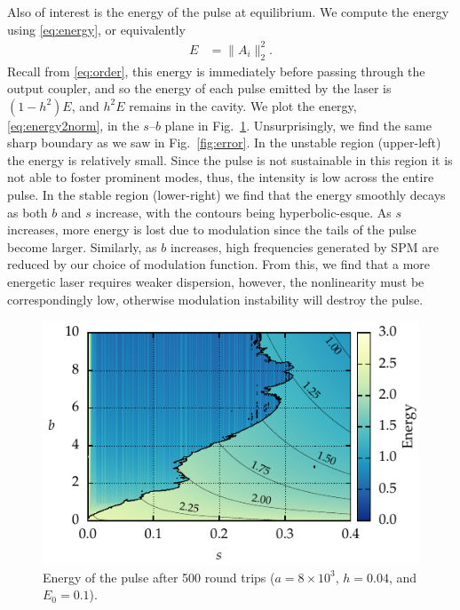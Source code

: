\documentclass[9pt,twocolumn,twoside]{osajnl}
\begin{document}
Also of interest is the energy of the pulse at equilibrium. We compute the energy using \eqref{eq:energy}, or equivalently 
\begin{align}
	E &= \| A_i \|_2^2.
	\label{eq:energy2norm}
\end{align}
Recall from \eqref{eq:order}, this energy is immediately before passing through the output coupler, and so the energy of each pulse emitted by the laser is $(1 - h^2) E$, and $h^2 E$ remains in the cavity. We plot the energy, \eqref{eq:energy2norm}, in the $s$--$b$ plane in Fig.~\ref{fig:energy}. Unsurprisingly, we find the same sharp boundary as we saw in Fig.~\ref{fig:error}. In the unstable region (upper-left) the energy is relatively small. Since the pulse is not sustainable in this region it is not able to foster prominent modes, thus, the intensity is low across the entire pulse. In the stable region (lower-right) we find that the energy smoothly decays as both $b$ and $s$ increase, with the contours being hyperbolic-esque. As $s$ increases, more energy is lost due to modulation since the tails of the pulse become larger. Similarly, as $b$ increases, high frequencies generated by SPM are reduced by our choice of modulation function. From this, we find that a more energetic laser requires weaker dispersion, however, the nonlinearity must be correspondingly low, otherwise modulation instability will destroy the pulse.

\begin{figure}[tbp]
	\centering
	\includegraphics{Figures/ParamSpaceEnergy}
	\caption{Energy of the pulse after 500 round trips ($a = 8 \times 10^3$, $h = 0.04$, and $E_0 = 0.1$).}
	\label{fig:energy}
\end{figure}
\end{document}
